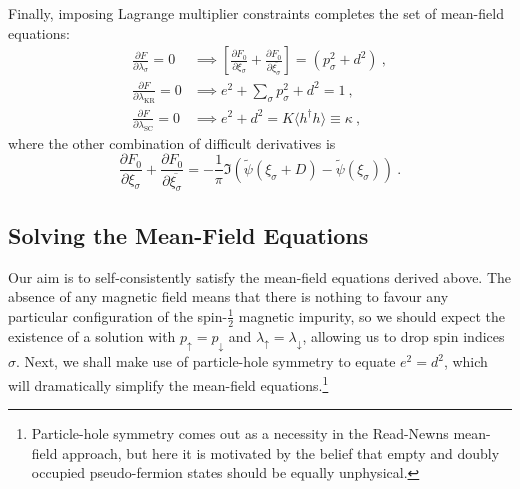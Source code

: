 \documentclass[12pt]{article}
\begin{document}

Finally, imposing Lagrange multiplier constraints completes the set of mean-field equations:
\begin{align}
\frac{\partial F}{\partial \lambda_{\sigma}} = 0 &\implies \left[ \frac{\partial F_{0}}{\partial \xi_{\sigma}} + \frac{\partial F_{0}}{\partial \overline{\xi_{\sigma}}} \right] = (p^2_{\sigma} + d^2) ~ , \label{eq:MF_lambda_sigma} \\
\frac{\partial F}{\partial \lambda_{\text{KR}}} = 0 &\implies e^2 + \sum_{\sigma} p^2_{\sigma} + d^2 = 1 ~ , \label{eq:MF_lambda_KR} \\
\frac{\partial F}{\partial \lambda_{\text{SC}}} = 0 &\implies e^2 + d^2 = K \langle h^{\dagger} h \rangle \equiv \kappa ~ , \label{eq:MF_lambda_SC}
\end{align}
where the other combination of difficult derivatives is
\begin{equation}
\frac{\partial F_{0}}{\partial \xi_{\sigma}} + \frac{\partial F_{0}}{\partial \overline{\xi_{\sigma}}} = - \frac{1}{\pi} \Im{( \widetilde{\psi}(\xi_{\sigma} + D) - \widetilde{\psi}(\xi_{\sigma}))} ~ .
\end{equation}




\subsection{Solving the Mean-Field Equations}
\label{subsec:solving_MF}

Our aim is to self-consistently satisfy the mean-field equations derived above. The absence of any magnetic field means that there is nothing to favour any particular configuration of the spin-$\frac{1}{2}$ magnetic impurity, so we should expect the existence of a solution with $ p_{\uparrow} = p_{\downarrow} $ and $ \lambda_{\uparrow} = \lambda_{\downarrow} $, allowing us to drop spin indices $ \sigma $. Next, we shall make use of particle-hole symmetry to equate $ e^2 = d^2 $, which will dramatically simplify the mean-field equations.\footnote{Particle-hole symmetry comes out as a necessity in the Read-Newns mean-field approach, but here it is motivated by the belief that empty and doubly occupied pseudo-fermion states should be equally unphysical.}
\end{document}
